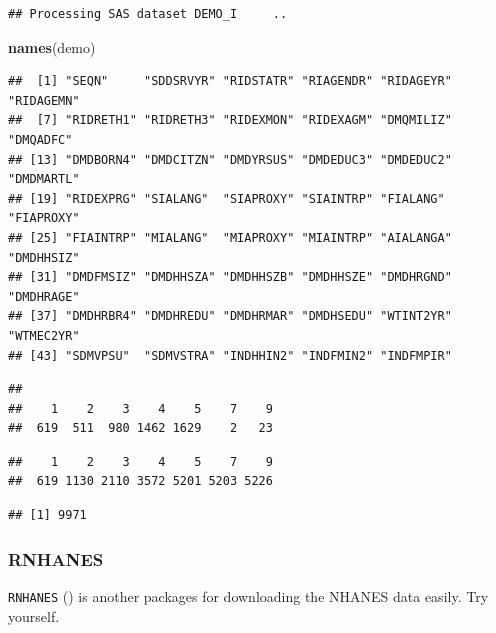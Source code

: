 \documentclass[
]{book}
\newenvironment{Shaded}{\begin{snugshade}}{\end{snugshade}}
\newcommand{\KeywordTok}[1]{\textcolor[rgb]{0.13,0.29,0.53}{\textbf{#1}}}
\newcommand{\NormalTok}[1]{#1}
\newcommand{\OperatorTok}[1]{\textcolor[rgb]{0.81,0.36,0.00}{\textbf{#1}}}
\begin{document}
\begin{verbatim}
## Processing SAS dataset DEMO_I 	 ..
\end{verbatim}

\begin{Shaded}
\begin{Highlighting}[]
\KeywordTok{names}\NormalTok{(demo)}
\end{Highlighting}
\end{Shaded}

\begin{verbatim}
##  [1] "SEQN"     "SDDSRVYR" "RIDSTATR" "RIAGENDR" "RIDAGEYR" "RIDAGEMN"
##  [7] "RIDRETH1" "RIDRETH3" "RIDEXMON" "RIDEXAGM" "DMQMILIZ" "DMQADFC" 
## [13] "DMDBORN4" "DMDCITZN" "DMDYRSUS" "DMDEDUC3" "DMDEDUC2" "DMDMARTL"
## [19] "RIDEXPRG" "SIALANG"  "SIAPROXY" "SIAINTRP" "FIALANG"  "FIAPROXY"
## [25] "FIAINTRP" "MIALANG"  "MIAPROXY" "MIAINTRP" "AIALANGA" "DMDHHSIZ"
## [31] "DMDFMSIZ" "DMDHHSZA" "DMDHHSZB" "DMDHHSZE" "DMDHRGND" "DMDHRAGE"
## [37] "DMDHRBR4" "DMDHREDU" "DMDHRMAR" "DMDHSEDU" "WTINT2YR" "WTMEC2YR"
## [43] "SDMVPSU"  "SDMVSTRA" "INDHHIN2" "INDFMIN2" "INDFMPIR"
\end{verbatim}

\begin{Shaded}
\end{Shaded}

\begin{verbatim}
## 
##    1    2    3    4    5    7    9 
##  619  511  980 1462 1629    2   23
\end{verbatim}

\begin{Shaded}
\end{Shaded}

\begin{verbatim}
##    1    2    3    4    5    7    9 
##  619 1130 2110 3572 5201 5203 5226
\end{verbatim}

\begin{Shaded}
\end{Shaded}

\begin{verbatim}
## [1] 9971
\end{verbatim}

\hypertarget{rnhanes}{%
\subsubsection{RNHANES}\label{rnhanes}}

\texttt{RNHANES} (\citet{RNHANES}) is another packages for downloading the NHANES data easily. Try yourself.

  
\end{document}
